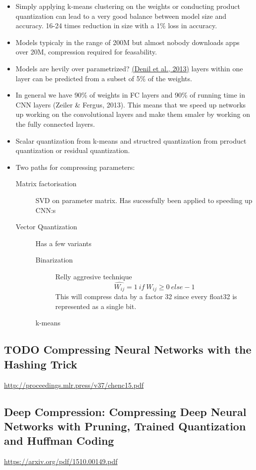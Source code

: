 \documentclass[11pt]{article}
\begin{document}
\begin{itemize}
\item Simply applying k-means clustering on the weights or conducting product quantization can lead to a very good balance between model size and accuracy. 16-24 times reduction in size with a 1\% loss in accuracy.
\item Models typicaly in the range of 200M but almost nobody downloads apps over 20M, compression required for feasability.
\item Models are hevily over parametrized? \href{http://papers.nips.cc/paper/5025-predicting-parameters-in-deep-learning.pdf}{(Denil et al., 2013)} layers within one layer can be predicted from a subset of 5\% of the weights.
\item In general we have 90\% of weights in FC layers and 90\% of running time in CNN layers (Zeiler \& Fergus, 2013). This means that we speed up networks up working on the convolutional layers and make them smaler by working on the fully connected layers.
\item Scalar quantization from k-means and structred quantization from prroduct quantization or residual quantization.
\item Two paths for compressing parameters:
\begin{description}
\item[{Matrix factorisation}] SVD on parameter matrix. Has sucessfully been applied to speeding up CNN:s
\item[{Vector Quantization}] Has a few variants
\begin{description}
\item[{Binarization}] Relly aggresive technique \[ \hat{W_{ij}} = 1 ~ \textit{if} ~ W_{ij} \geq 0 ~ \textit{else} -1 \] This will compress data by a factor 32 since every float32 is represented as a single bit.
\item[{k-means}] 
\end{description}
\end{description}
\end{itemize}

\subsection{{\bfseries\sffamily TODO} Compressing Neural Networks with the Hashing Trick}
\label{sec:org0f90d51}
\url{http://proceedings.mlr.press/v37/chenc15.pdf}

\subsection{Deep Compression: Compressing Deep Neural Networks with Pruning, Trained Quantization and Huffman Coding}
\label{sec:orgdb095f1}
\url{https://arxiv.org/pdf/1510.00149.pdf}
\end{document}
